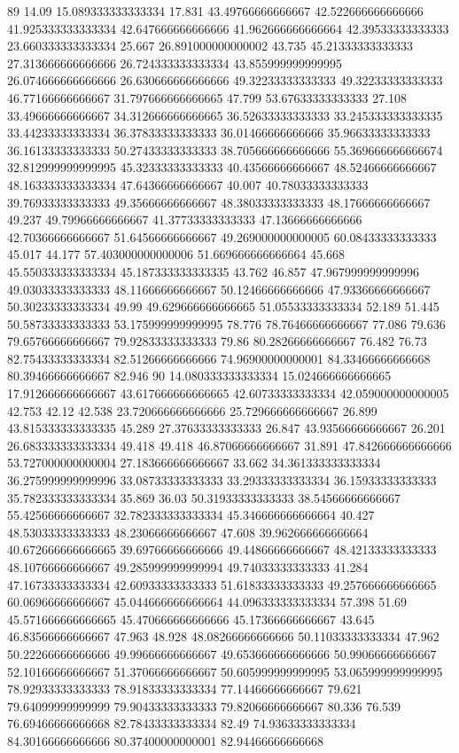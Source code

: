 89 14.09 15.089333333333334 17.831 43.49766666666667 42.522666666666666 41.925333333333334 42.647666666666666 41.962666666666664 42.39533333333333 23.660333333333334 25.667 26.891000000000002 43.735 45.21333333333333 27.313666666666666 26.724333333333334 43.855999999999995 26.074666666666666 26.630666666666666 49.32233333333333 49.32233333333333 46.77166666666667 31.797666666666665 47.799 53.67633333333333 27.108 33.49666666666667 34.312666666666665 36.52633333333333 33.245333333333335 33.44233333333334 36.37833333333333 36.01466666666666 35.96633333333333 36.16133333333333 50.27433333333333 38.705666666666666 55.369666666666674 32.812999999999995 45.32333333333333 40.43566666666667 48.52466666666667 48.163333333333334 47.64366666666667 40.007 40.78033333333333 39.76933333333333 49.35666666666667 48.38033333333333 48.17666666666667 49.237 49.79966666666667 41.37733333333333 47.13666666666666 42.70366666666667 51.64566666666667 49.269000000000005 60.08433333333333 45.017 44.177 57.403000000000006 51.669666666666664 45.668 45.550333333333334 45.187333333333335 43.762 46.857 47.967999999999996 49.03033333333333 48.11666666666667 50.12466666666666 47.93366666666667 50.30233333333334 49.99 49.629666666666665 51.05533333333334 52.189 51.445 50.58733333333333 53.175999999999995 78.776 78.76466666666667 77.086 79.636 79.65766666666667 79.92833333333333 79.86 80.28266666666667 76.482 76.73 82.75433333333334 82.51266666666666 74.96900000000001 84.33466666666668 80.39466666666667 82.946
90 14.080333333333334 15.024666666666665 17.912666666666667 43.617666666666665 42.60733333333334 42.059000000000005 42.753 42.12 42.538 23.720666666666666 25.729666666666667 26.899 43.815333333333335 45.289 27.37633333333333 26.847 43.93566666666667 26.201 26.683333333333334 49.418 49.418 46.87066666666667 31.891 47.842666666666666 53.727000000000004 27.183666666666667 33.662 34.361333333333334 36.275999999999996 33.08733333333333 33.29333333333334 36.15933333333333 35.782333333333334 35.869 36.03 50.31933333333333 38.54566666666667 55.42566666666667 32.782333333333334 45.346666666666664 40.427 48.53033333333333 48.23066666666667 47.608 39.962666666666664 40.672666666666665 39.69766666666666 49.44866666666667 48.42133333333333 48.10766666666667 49.285999999999994 49.74033333333333 41.284 47.16733333333334 42.60933333333333 51.61833333333333 49.257666666666665 60.06966666666667 45.044666666666664 44.096333333333334 57.398 51.69 45.571666666666665 45.470666666666666 45.17366666666667 43.645 46.83566666666667 47.963 48.928 48.08266666666666 50.11033333333334 47.962 50.22266666666666 49.99666666666667 49.653666666666666 50.99066666666667 52.10166666666667 51.37066666666667 50.605999999999995 53.065999999999995 78.92933333333333 78.91833333333334 77.14466666666667 79.621 79.64099999999999 79.90433333333333 79.82066666666667 80.336 76.539 76.69466666666668 82.78433333333334 82.49 74.93633333333334 84.30166666666666 80.37400000000001 82.94466666666668
